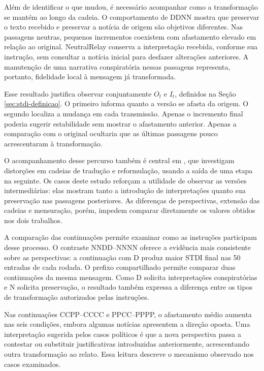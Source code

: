 Além de identificar o que mudou, é necessário acompanhar como a transformação se mantém ao longo da cadeia. O comportamento de DDNN mostra que preservar o texto recebido e preservar a notícia de origem são objetivos diferentes. Nas passagens neutras, pequenos incrementos coexistem com afastamento elevado em relação ao original. NeutralRelay conserva a interpretação recebida, conforme sua instrução, sem consultar a notícia inicial para desfazer alterações anteriores. A manutenção de uma narrativa conspiratória nessas passagens representa, portanto, fidelidade local à mensagem já transformada.

Esse resultado justifica observar conjuntamente $O_t$ e $I_t$, definidos na Seção \ref{sec:stdi-definicao}. O primeiro informa quanto a versão se afasta da origem. O segundo localiza a mudança em cada transmissão. Apenas o incremento final poderia sugerir estabilidade sem mostrar o afastamento anterior. Apenas a comparação com o original ocultaria que as últimas passagens pouco acrescentaram à transformação.

O acompanhamento desse percurso também é central em , que investigam distorções em cadeias de tradução e reformulação, usando a saída de uma etapa na seguinte. Os casos deste estudo reforçam a utilidade de observar as versões intermediárias: elas mostram tanto a introdução de interpretações quanto sua preservação nas passagens posteriores. As diferenças de perspectivas, extensão das cadeias e mensuração, porém, impedem comparar diretamente os valores obtidos nos dois trabalhos.

A comparação das continuações permite examinar como as instruções participam desse processo. O contraste NNDD--NNNN oferece a evidência mais consistente sobre as perspectivas: a continuação com D produz maior STDI final nas 50 entradas de cada rodada. O prefixo compartilhado permite comparar duas continuações da mesma mensagem. Como D solicita interpretações conspiratórias e N solicita preservação, o resultado também expressa a diferença entre os tipos de transformação autorizados pelas instruções.

Nas continuações CCPP--CCCC e PPCC--PPPP, o afastamento médio aumenta nas seis condições, embora algumas notícias apresentem a direção oposta. Uma interpretação sugerida pelos casos políticos é que a nova perspectiva passa a contestar ou substituir justificativas introduzidas anteriormente, acrescentando outra transformação ao relato. Essa leitura descreve o mecanismo observado nos casos examinados.

